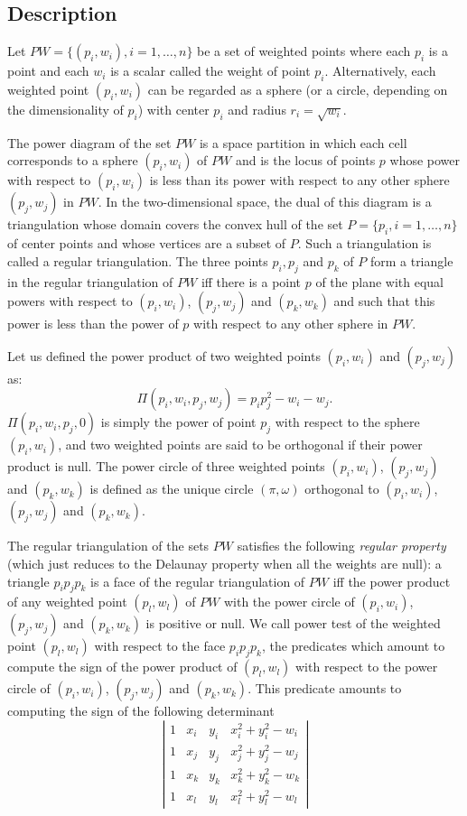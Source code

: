 \subsection{Description}
\label{Subsection_2D_Triangulations_Regular_Description}
Let ${  PW} = \{(p_i, w_i), i = 1, \ldots , n \}$ be a set of 
weighted points where each $p_i$ is a point and each $w_i$
is a scalar called the weight of point $p_i$.
Alternatively, each weighted point $(p_i, w_i)$ can be regarded
as a sphere (or a circle, depending on the dimensionality
of $p_i$)  with center $p_i$ and radius $r_i=\sqrt{w_i}$.

The power diagram of the set ${  PW}$ is a space partition in which
 each cell corresponds to a sphere $(p_i, w_i)$ of ${  PW}$
and is the locus of points  $p$ whose power with respect to $(p_i, w_i)$
is less than its power with respect to any other sphere $(p_j, w_j)$
in ${  PW}$. In the two-dimensional space,
the dual of this diagram is a triangulation 
whose domain covers the convex hull of the set 
${  P}= \{ p_i, i = 1, \ldots , n \}$ of center points
and whose vertices are a subset of ${  P}$.
Such a triangulation is called a regular triangulation.
The  three points $p_i, p_j$ and $p_k$ of ${  P}$
form a triangle in the regular triangulation of ${  PW}$
iff there is a point $p$ of the plane with equal 
powers with respect to $(p_i, w_i)$, $(p_j, w_j)$
and $(p_k, w_k)$ and such that this power 
is  less than the power of $p$
with respect to any other sphere in  ${  PW}$.

Let us defined the power product of two weighted points
$(p_i, w_i)$ and $(p_j, w_j)$ as:
\[\Pi(p_i, w_i,p_j, w_j) = p_ip_j ^2 - w_i  - w_j  .\]
$\Pi(p_i, w_i,p_j, 0)$ is simply the power of point $p_j$
with respect to the sphere $(p_i, w_i)$, and two weighted points 
are said to be orthogonal if their power product is null.
The power circle of three weighted points
 $(p_i, w_i)$, $(p_j, w_j)$
and $(p_k, w_k)$ is defined as the unique circle
$(\pi, \omega)$  orthogonal to
 $(p_i, w_i)$, $(p_j, w_j)$
and $(p_k, w_k)$.

The regular triangulation of the sets ${  PW}$
satisfies the following {\em regular property} (which just reduces to the 
Delaunay property when all the weights are null):
a triangle $p_ip_jp_k$ is a face of the regular triangulation
of ${  PW}$ iff the power product of any weighted point
 $(p_l, w_l)$ of ${  PW}$ with the power circle of
 $(p_i, w_i)$, $(p_j, w_j)$ and $(p_k, w_k)$ is positive or null.
We call  power test of the weighted point $(p_l, w_l)$ with respect
to the face  $p_ip_jp_k$, the predicates which amount to compute
the sign of 
the power product of $(p_l, w_l)$ with respect to
the power circle of
 $(p_i, w_i)$, $(p_j, w_j)$ and $(p_k, w_k)$.
This predicate amounts to computing the sign of
the following
determinant
\[\left| \begin{array}{cccc}
1  &  x_i  &  y_i  &  x_i ^2 + y_i ^2 - w_i  \\
1  &  x_j  &  y_j  &  x_j ^2 + y_j ^2 - w_j  \\
1  &  x_k  &  y_k  &  x_k ^2 + y_k ^2 - w_k  \\
1  &  x_l  &  y_l  &  x_l ^2 + y_l ^2 - w_l
\end{array}
\right|
\]

